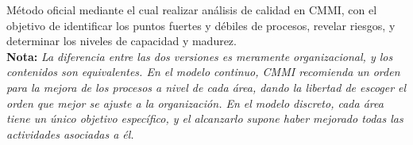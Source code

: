 Método oficial mediante el cual realizar análisis de calidad en CMMI, con el objetivo de identificar los puntos fuertes y débiles de procesos, revelar riesgos, y determinar los niveles de capacidad y madurez.\\

\textbf{Nota:} \textit{La diferencia entre las dos versiones es meramente organizacional, y los contenidos son equivalentes. En el modelo continuo, CMMI recomienda un orden para la mejora de los procesos a nivel de cada área, dando la libertad de escoger el orden que mejor se ajuste a la organización. En el modelo discreto, cada área tiene un único objetivo específico, y el alcanzarlo supone haber mejorado todas las actividades asociadas a él.}